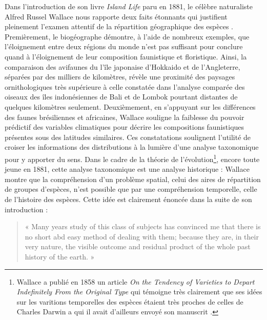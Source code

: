 Dans l'introduction de son livre \emph{Island Life} paru en 1881, le
célèbre naturaliste Alfred Russel Wallace nous rapporte deux faits
étonnants qui justifient pleinement l'examen attentif de la répartition
géographique des espèces \citep{wallace1881island}. Premièrement, le
biogéographe démontre, à l'aide de nombreux exemples, que l'éloignement
entre deux régions du monde n'est pas suffisant pour conclure quand à
l'éloignement de leur composition faunistique et floristique. Ainsi, la
comparaison des avifaunes du l'île japonaise d'Hokkaido et de
l'Angleterre, séparées par des milliers de kilomètres, révèle une
proximité des paysages ornithologiques très supérieure à celle constatée
dans l'analyse comparée des oiseaux des îles indonésiennes de Bali et de
Lombok pourtant distantes de quelques kilomètres seulement.
Deuxièmement, en s'appuyant sur les différences des faunes brésiliennes
et africaines, Wallace souligne la faiblesse du pouvoir prédictif des
variables climatiques pour décrire les compositions faunistiques
présentes sous des latitudes similaires. Ces constatations soulignent
l'utilité de croiser les informations des distributions à la lumière
d'une analyse taxonomique pour y apporter du sens. Dans le cadre de la
théorie de l'évolution\footnote{Wallace a publié en 1858 un article
  \emph{On the Tendency of Varieties to Depart Indefinitely From the
  Original Type} qui témoigne très clairement que ses idées sur les
  varitions temporelles des espèces étaient très proches de celles de
  Charles Darwin a qui il avait d'ailleurs envoyé son manuscrit
  \citep{Wallace1858}.}, encore toute jeune en 1881, cette analyse
taxonomique est une analyse historique : Wallace montre que la
compréhension d'un problème spatial, celui des aires de répartition de
groupes d'espèces, n'est possible que par une compréhension temporelle,
celle de l'histoire des espèces. Cette idée est clairement énoncée dans
la suite de son introduction :

\begin{quote}
« Many years study of this class of subjects has convinced me that there
is no short abd easy method of dealing with them; because they are, in
their very nature, the visible outcome and residual product of the whole
past history of the earth. »
\end{quote}

